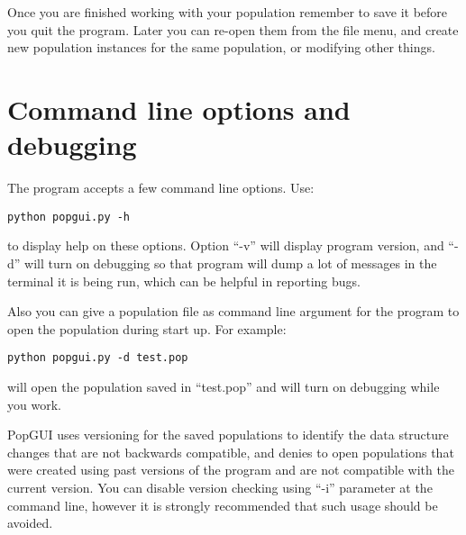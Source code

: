 \documentclass[10pt]{article}
\begin{document}
Once you are finished working with your population remember to save it before you quit the program. Later you can re-open them from the file menu, and create new population instances for the same population, or modifying other things.


\section{Command line options and debugging}
The program accepts a few command line options. Use:
\begin{verbatim}
python popgui.py -h
\end{verbatim}
to display help on these options. Option ``-v'' will display program version, and ``-d'' will turn on debugging so that program will dump a lot of messages in the terminal it is being run, which can be helpful in reporting bugs. 

Also you can give a population file as command line argument for the program to open the population during start up. For example:
\begin{verbatim}
python popgui.py -d test.pop
\end{verbatim}
will open the population saved in ``test.pop'' and will turn on debugging while you work.

PopGUI uses versioning for the saved populations to identify the data structure changes that are not backwards compatible, and denies to open populations that were created using past versions of the program and are not compatible with the current version. You can disable version checking using ``-i'' parameter at the command line, however it is strongly recommended that such usage should be avoided.
\end{document}
